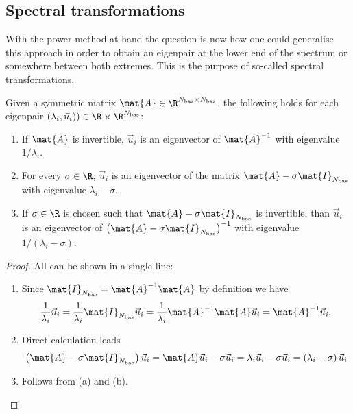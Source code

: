 
\subsection{Spectral transformations}
\label{sec:ShiftInvert}
With the power method at hand the question is now how one could
generalise this approach in order to obtain an eigenpair at the lower end of the
spectrum or somewhere between both extremes.
This is the purpose of so-called spectral transformations.

\begin{prop}
	\label{prop:Spectral}
	Given a symmetric matrix $\mat{A} \in \R^{\Nbas \times \Nbas}$,
	the following holds for each eigenpair
	$(\lambda_i, \vec{u}_i)) \in \R \times \R^{\Nbas}$:
	\begin{enumerate}[label=(\alph*)]
		\item If $\mat{A}$ is invertible,
			$\vec{u}_i$ is an eigenvector of $\mat{A}^{-1}$ with eigenvalue
			$1 / \lambda_i$.
		\item For every $\sigma \in \R$, $\vec{u}_i$ is an eigenvector
			of the matrix $\mat{A} - \sigma \mat{I}_{\Nbas}$
			with eigenvalue $\lambda_i - \sigma$.
		\item If $\sigma \in \R$ is chosen such that
			$\mat{A} - \sigma \mat{I}_{\Nbas}$
			is invertible, than  $\vec{u}_i$ is an eigenvector
			of $\left( \mat{A} - \sigma \mat{I}_{\Nbas} \right)^{-1}$
			with eigenvalue $1 / (\lambda_i - \sigma)$.
	\end{enumerate}
	\begin{proof}
		All can be shown in a single line:
		\begin{enumerate}[label=(\alph*)]
			\item Since $\mat{I}_{\Nbas} = \mat{A}^{-1} \mat{A}$
				by definition we have
				\[ \frac{1}{\lambda_i} \vec{u}_i
					= \frac{1}{\lambda_i} \mat{I}_{\Nbas} \vec{u}_i
					= \frac{1}{\lambda_i} \mat{A}^{-1} \mat{A} \vec{u}_i
					= \mat{A}^{-1} \vec{u}_i.
				\]
			\item Direct calculation leads
				\[ \left( \mat{A} - \sigma \mat{I}_{\Nbas} \right) \vec{u}_i
					= \mat{A} \vec{u}_i - \sigma \vec{u}_i
					= \lambda_i \vec{u}_i - \sigma \vec{u}_i
					= \left( \lambda_i - \sigma  \right) \vec{u}_i
				\]
			\item Follows from (a) and (b).
		\end{enumerate}
	\end{proof}
\end{prop}

